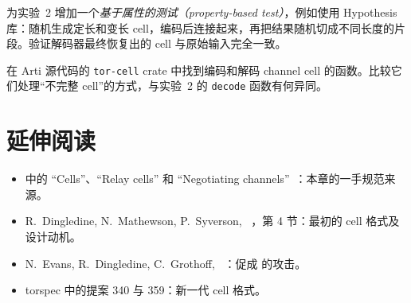 \begin{esercizio}[3]\label{es:08-lab-fuzz}
为实验~2 增加一个\emph{基于属性的测试（property-based test）}，例如使用 Hypothesis 库：随机生成定长和变长 cell，编码后连接起来，再把结果随机切成不同长度的片段。验证解码器最终恢复出的 cell 与原始输入完全一致。
\end{esercizio}

\begin{esercizio}[3]\label{es:08-arti}
在 Arti 源代码的 \texttt{tor-cell} crate 中找到编码和解码 channel cell 的函数。比较它们处理\enquote{不完整 cell}的方式，与实验~2 的 \texttt{decode} 函数有何异同。
\end{esercizio}

\section*{延伸阅读}
\begin{itemize}
  \item {} 中的 \enquote{Cells}、\enquote{Relay cells} 和 \enquote{Negotiating channels}~\cite{torspec}：本章的一手规范来源。
  \item R.~Dingledine, N.~Mathewson, P.~Syverson, ~\cite{dingledine2004tor}，第 4 节：最初的 cell 格式及设计动机。
  \item N.~Evans, R.~Dingledine, C.~Grothoff, ~\cite{evans2009congestion}：促成  的攻击。
  \item torspec 中的提案 340 与 359：新一代 cell 格式。
\end{itemize}
